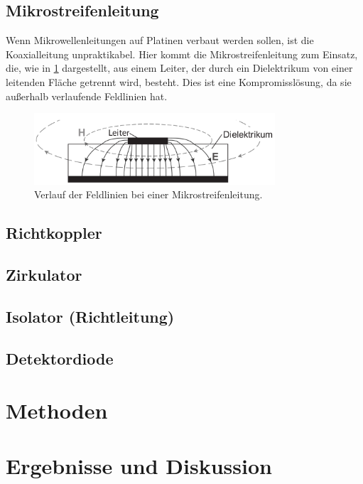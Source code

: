 \documentclass[
	a4paper,
	12pt,
	pagesize,
	ngerman
]{scrartcl}
\begin{document}
	\subsection{Mikrostreifenleitung}

	Wenn Mikrowellenleitungen auf Platinen verbaut werden sollen, ist die Koaxialleitung unpraktikabel.
	Hier kommt die Mikrostreifenleitung zum Einsatz, die, wie in \cref{fig_mikrostreifen} dargestellt, aus einem Leiter, der durch ein Dielektrikum von einer leitenden Fläche getrennt wird, besteht.
	Dies ist eine Kompromisslösung, da sie außerhalb verlaufende Feldlinien hat.

	\begin{figure}[H]
		\includegraphics[width=0.8\textwidth]{img/mirkostreifen}
		\centering
		\caption{
			Verlauf der Feldlinien bei einer Mikrostreifenleitung. \cite{Anleitung}
		}
		\label{fig_mikrostreifen}
		\centering
	\end{figure}


	\subsection{Richtkoppler}


	\subsection{Zirkulator}


	\subsection{Isolator (Richtleitung)}


	\subsection{Detektordiode}

	\section{Methoden}

	\section{Ergebnisse und Diskussion}
\end{document}

